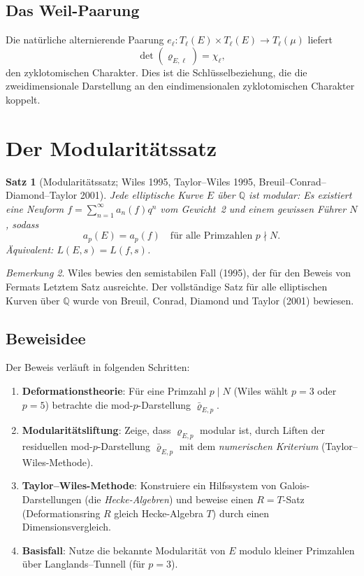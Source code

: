 \documentclass[a4paper,12pt]{amsart}
\newtheorem{theorem}{Satz}[section]
\theoremstyle{definition}
\theoremstyle{remark}
\newtheorem{bemerkung}[theorem]{Bemerkung}
\newcommand{\Q}{\mathbb{Q}}
\newcommand{\Tl}{T_\ell}
\begin{document}
\subsection{Das Weil-Paarung}

Die natürliche alternierende Paarung $e_\ell\colon \Tl(E) \times \Tl(E) \to \Tl(\mu)$
liefert
\[
  \det(\varrho_{E,\ell}) = \chi_\ell,
\]
den zyklotomischen Charakter. Dies ist die Schlüsselbeziehung, die die
zweidimensionale Darstellung an den eindimensionalen zyklotomischen Charakter koppelt.

\section{Der Modularitätssatz}
\label{sec:modularitaet}

\begin{theorem}[Modularitätssatz; Wiles 1995, Taylor--Wiles 1995,
  Breuil--Conrad--Diamond--Taylor 2001]
\label{satz:modularitaet}
Jede elliptische Kurve $E$ über $\Q$ ist modular: Es existiert eine Neuform
$f = \sum_{n=1}^\infty a_n(f) q^n$ vom Gewicht~2 und einem gewissen Führer $N$, sodass
\[
  a_p(E) = a_p(f) \quad \text{für alle Primzahlen } p \nmid N.
\]
Äquivalent: $L(E, s) = L(f, s)$.
\end{theorem}

\begin{bemerkung}
Wiles bewies den semistabilen Fall (1995), der für den Beweis von Fermats Letztem
Satz ausreichte. Der vollständige Satz für alle elliptischen Kurven über $\Q$ wurde
von Breuil, Conrad, Diamond und Taylor (2001) bewiesen.
\end{bemerkung}

\subsection{Beweisidee}

Der Beweis verläuft in folgenden Schritten:

\begin{enumerate}[label=(\roman*)]
\item \textbf{Deformationstheorie}: Für eine Primzahl $p \mid N$ (Wiles wählt $p = 3$
oder $p = 5$) betrachte die mod-$p$-Darstellung $\bar{\varrho}_{E,p}$.

\item \textbf{Modularitätsliftung}: Zeige, dass $\varrho_{E,p}$ modular ist, durch
Liften der residuellen mod-$p$-Darstellung $\bar{\varrho}_{E,p}$ mit dem
\emph{numerischen Kriterium} (Taylor--Wiles-Methode).

\item \textbf{Taylor--Wiles-Methode}: Konstruiere ein Hilfssystem von
Galois-Darstellungen (die \emph{Hecke-Algebren}) und beweise einen $R = T$-Satz
(Deformationsring $R$ gleich Hecke-Algebra $T$) durch einen Dimensionsvergleich.

\item \textbf{Basisfall}: Nutze die bekannte Modularität von $E$ modulo kleiner
Primzahlen über Langlands--Tunnell (für $p = 3$).
\end{enumerate}
\end{document}
